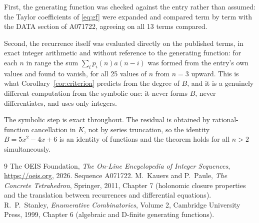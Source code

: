 \documentclass[11pt,a4paper]{article}
\theoremstyle{plain}
\theoremstyle{definition}
\begin{document}
First, the generating function was checked against the entry rather than assumed: the
Taylor coefficients of \eqref{eq:gf} were expanded and compared term by term with the DATA
section of A071722, agreeing on all 13 terms compared.

Second, the recurrence itself was evaluated directly on the published terms, in exact
integer arithmetic and without reference to the generating function: for each $n$ in range
the sum $\sum_{i}p_{i}(n)a(n-i)$ was formed from the entry's own values and found to
vanish, for all 25 values of $n$ from $n=3$ upward. This is what
Corollary~\ref{cor:criterion} predicts from the degree of $B$, and it is a genuinely
different computation from the symbolic one: it never forms $B$, never differentiates, and
uses only integers.

The symbolic step is exact throughout. The residual is obtained by rational-function
cancellation in $K$, not by series truncation, so the identity $B=5 x^{2} - 4 x + 6$ is an
identity of functions and the theorem holds for all $n>2$ simultaneously.

\begin{thebibliography}{9}
 The OEIS Foundation, \emph{The On-Line Encyclopedia of Integer Sequences},
\url{https://oeis.org}, 2026. Sequence A071722.
 M.~Kauers and P.~Paule, \emph{The Concrete Tetrahedron}, Springer, 2011,
Chapter 7 (holonomic closure properties and the translation between recurrences and
differential equations).
 R.~P.~Stanley, \emph{Enumerative Combinatorics}, Volume 2, Cambridge
University Press, 1999, Chapter 6 (algebraic and D-finite generating functions).
\end{thebibliography}
\end{document}

